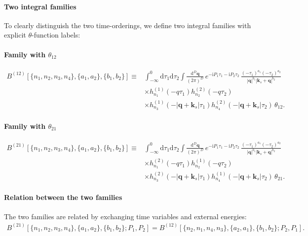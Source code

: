 \documentclass[a4paper,12pt]{article}
\newcommand{\FR}[2]{\displaystyle\frac{\,{#1}\,}{#2}}
\def\di{{\mathrm{d}}}
\def\mb{\mathbf}
\def\ii{\mathrm{i}}
\begin{document}
\paragraph{Two integral families} To clearly distinguish the two time-orderings, we define two integral families with explicit $\theta$-function labels:

\paragraph{Family with $\theta_{12}$}
\begin{align}
	B^{(12)}[\{n_1,n_2,n_3,n_4\},\{a_1,a_2\},\{b_1,b_2\}] \equiv & \int_{-\infty}^0 \di\tau_1\di\tau_2 \int \FR{\di^D \mb q}{(2\pi)^D}\, e^{-\ii P_1\tau_1 - \ii P_2 \tau_2}\,
	\frac{(-\tau_1)^{a_1}(-\tau_2)^{a_2}}{|\mb q|^{b_1}|\mb k_s+\mb q|^{b_2}} \nonumber \\
	& \times h_{n_1}^{(1)}(-q\tau_1)h_{n_2}^{(2)}(-q\tau_2)\nonumber\\
	& \times h_{n_3}^{(1)}(-|\mb q+\mb k_s|\tau_1)h_{n_4}^{(2)}(-|\mb q+\mb k_s|\tau_2)\,\theta_{12}.
\end{align}

\paragraph{Family with $\theta_{21}$}
\begin{align}
	B^{(21)}[\{n_1,n_2,n_3,n_4\},\{a_1,a_2\},\{b_1,b_2\}] \equiv & \int_{-\infty}^0 \di\tau_1\di\tau_2 \int \FR{\di^D \mb q}{(2\pi)^D}\, e^{-\ii P_1\tau_1 - \ii P_2 \tau_2}\,
	\frac{(-\tau_1)^{a_1}(-\tau_2)^{a_2}}{|\mb q|^{b_1}|\mb k_s+\mb q|^{b_2}} \nonumber \\
	& \times h_{n_1}^{(2)}(-q\tau_1)h_{n_2}^{(1)}(-q\tau_2)\nonumber\\
	& \times h_{n_3}^{(2)}(-|\mb q+\mb k_s|\tau_1)h_{n_4}^{(1)}(-|\mb q+\mb k_s|\tau_2)\,\theta_{21}.
\end{align}

\paragraph{Relation between the two families}
The two families are related by exchanging time variables and external energies:
\begin{align}
	B^{(21)}[\{n_1,n_2,n_3,n_4\},\{a_1,a_2\},\{b_1,b_2\}; P_1,P_2] = B^{(12)}[\{n_2,n_1,n_4,n_3\},\{a_2,a_1\},\{b_1,b_2\}; P_2,P_1].
\end{align}
\end{document}
